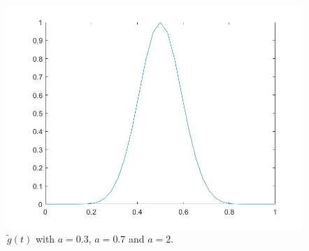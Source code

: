 \documentclass[11pt, a4paper]{article}
\theoremstyle{definition}
\begin{document}
\begin{figure}[h]
		\includegraphics[scale=0.25]{Pert2new.jpg}
		\caption{ $\tilde g(t)$ with $a = 0.3$, $a=0.7$ and $a = 2$. }
		\label{gTest}
	\end{figure}
\end{document}
